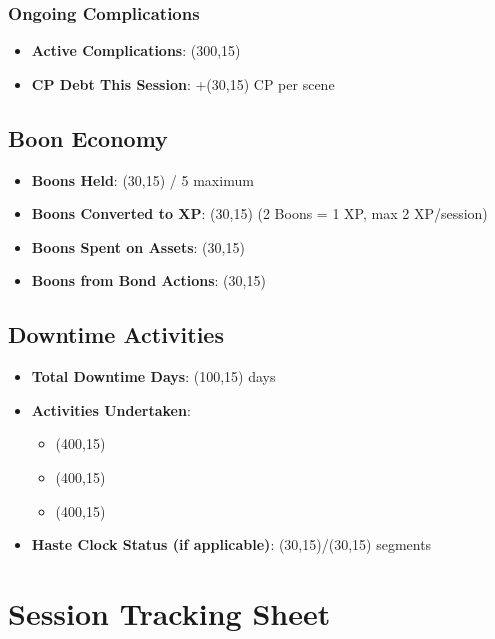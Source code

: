 \documentclass[11pt,letterpaper]{article}
\begin{document}
\subsubsection{Ongoing Complications}
\begin{itemize}
    \item \textbf{Active Complications}: \framebox(300,15){}
    \item \textbf{CP Debt This Session}: +\framebox(30,15){} CP per scene
\end{itemize}

\subsection{Boon Economy}

\begin{itemize}
    \item \textbf{Boons Held}: \framebox(30,15){} / 5 maximum
    \item \textbf{Boons Converted to XP}: \framebox(30,15){} (2 Boons = 1 XP, max 2 XP/session)
    \item \textbf{Boons Spent on Assets}: \framebox(30,15){}
    \item \textbf{Boons from Bond Actions}: \framebox(30,15){}
\end{itemize}

\subsection{Downtime Activities}

\begin{itemize}
    \item \textbf{Total Downtime Days}: \framebox(100,15){} days
    \item \textbf{Activities Undertaken}: 
    \begin{itemize}
        \item \framebox(400,15){}
        \item \framebox(400,15){}
        \item \framebox(400,15){}
    \end{itemize}
    \item \textbf{Haste Clock Status (if applicable)}: \framebox(30,15){}/\framebox(30,15){} segments
\end{itemize}

\newpage

\section{Session Tracking Sheet}
\end{document}
